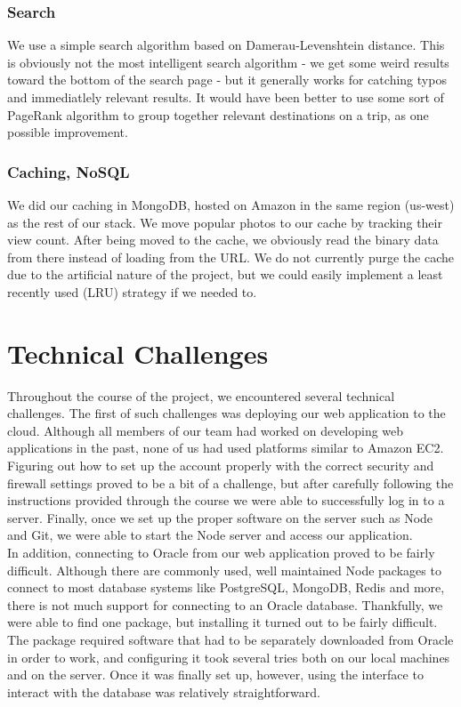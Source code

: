 \documentclass[11pt]{amsart}
\begin{document}
\subsubsection{Search}
We use a simple search algorithm based on Damerau-Levenshtein distance. This is
obviously not the most intelligent search algorithm - we get some weird results
toward the bottom of the search page - but it generally works for catching typos
and immediatlely relevant results. It would have been better to use some sort of
PageRank algorithm to group together relevant destinations on a trip, as one
possible improvement.
\subsubsection{Caching, NoSQL}
We did our caching in MongoDB, hosted on Amazon in the same region (us-west) as
the rest of our stack. We move popular photos to our cache by tracking their
view count. After being moved to the cache, we obviously read the binary data
from there instead of loading from the URL. We do not currently purge the cache
due to the artificial nature of the project, but we could easily implement a
least recently used (LRU) strategy if we needed to.

\section{Technical Challenges}
Throughout the course of the project, we encountered several technical challenges. The first of such 
challenges was deploying our web application to the cloud. Although all members of our team had 
worked on developing web applications in the past, none of us had used platforms similar to Amazon EC2.
Figuring out how to set up the account properly with the correct security and firewall settings proved
to be a bit of a challenge, but after carefully following the instructions provided through the course
we were able to successfully log in to a server. Finally, once we set up the proper software on the server
such as Node and Git, we were able to start the Node server and access our application.\\

In addition, connecting to Oracle from our web application proved to be fairly difficult. Although there are
commonly used, well maintained Node packages to connect to most database systems like PostgreSQL, MongoDB,
Redis and more, there is not much support for connecting to an Oracle database. Thankfully, we were able to find
one package, but installing it turned out to be fairly difficult. The package required software that had to be
separately downloaded from Oracle in order to work, and configuring it took several tries both on our local machines
and on the server. Once it was finally set up, however, using the interface to interact with the database was
relatively straightforward.\\
\end{document}
